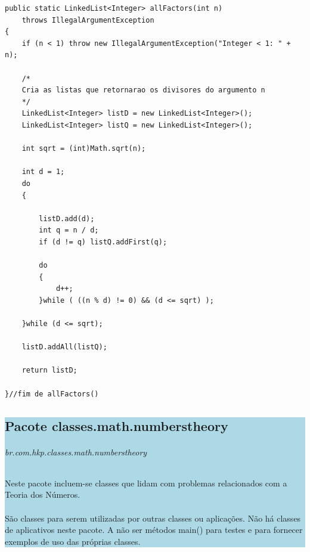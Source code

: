 \documentclass[a4paper,12pt,openany]{book}
\begin{document}
\begin{lstlisting}
public static LinkedList<Integer> allFactors(int n)
	throws IllegalArgumentException
{
	if (n < 1) throw new IllegalArgumentException("Integer < 1: " + n);
	
	/*
	Cria as listas que retornarao os divisores do argumento n
	*/
	LinkedList<Integer> listD = new LinkedList<Integer>();
	LinkedList<Integer> listQ = new LinkedList<Integer>();
	
	int sqrt = (int)Math.sqrt(n);
	
	int d = 1;
	do 
	{
	
		listD.add(d);
		int q = n / d;
		if (d != q) listQ.addFirst(q);
		
		do
		{
			d++;
		}while ( ((n % d) != 0) && (d <= sqrt) );
		
	}while (d <= sqrt);
	
	listD.addAll(listQ);
	
	return listD;

}//fim de allFactors()
\end{lstlisting}

\newpage

\colorbox{lightblue}{
	
	\begin{minipage}{18cm}
		
		\part*{Pacote classes.math.numberstheory}
		
		\paragraph{br.com.hkp.classes.math.numberstheory}
		
		Neste pacote incluem-se classes que lidam com problemas relacionados com a Teoria dos Números. 
		\\
		\\
		São classes para serem utilizadas por outras classes ou aplicações. Não há classes de aplicativos neste pacote. A não ser métodos main() para testes e para fornecer exemplos de uso das próprias classes.
		
	\end{minipage}
	
}%
\end{document}
